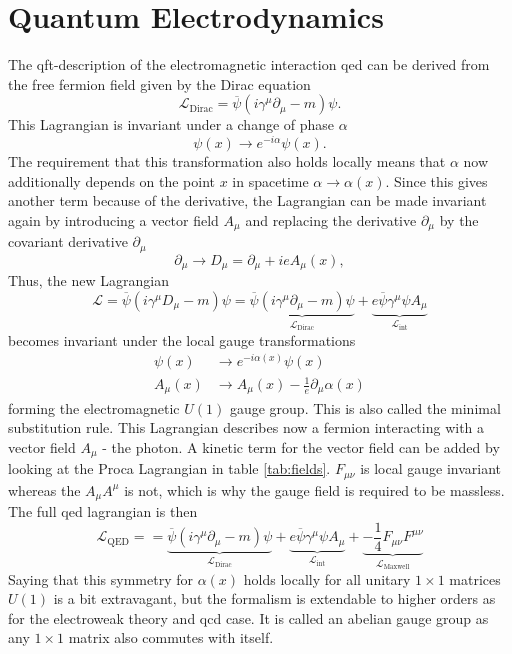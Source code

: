 \section{Quantum Electrodynamics}
 The \ac{qft}-description of the electromagnetic interaction \ac{qed} can be derived from the free fermion field given by the Dirac equation
\begin{equation}
    \mathcal{L}_\mathrm{Dirac} = \overline{\psi}(i \gamma^\mu \partial_\mu - m )\psi.
    \label{eq:dirac}
\end{equation}
This Lagrangian is invariant under a change of phase $\alpha$ 
\begin{equation}
    \psi(x) \rightarrow  e^{-i \alpha}\psi(x).
\end{equation}
The requirement that this transformation also holds locally means that $\alpha$ now additionally depends on the point $x$ in spacetime $\alpha \rightarrow \alpha(x)$. Since this gives another term because of the derivative, the Lagrangian can be made invariant again by introducing a vector field $A_\mu$ and replacing the derivative $\partial_\mu$ by the covariant derivative $\partial_\mu$ 
\begin{equation}
    \partial_\mu \rightarrow D_\mu = \partial_\mu + ie A_\mu(x),
    \label{eq:cov_diff}
\end{equation}
Thus, the new Lagrangian 
\begin{equation}
    \mathcal{L} = \overline{\psi}(i \gamma^\mu D_\mu - m )\psi
    =
    \underbrace{\overline{\psi}(i \gamma^\mu \partial_\mu - m )\psi}_{\mathcal{L}_\mathrm{Dirac} } 
    +
    \underbrace{ e\overline{\psi} \gamma^\mu {\psi}A_\mu}_{\mathcal{L}_\mathrm{int}}
\end{equation}
becomes invariant under the local gauge transformations
\begin{align}
\psi(x) &\rightarrow  e^{-i \alpha(x)}\psi(x)\\
 A_\mu(x) &\xrightarrow{} A_\mu(x) -\frac{1}{e}\partial_\mu\alpha(x)
\end{align}
forming the electromagnetic $U(1)$ gauge group. This is also called the minimal substitution rule. This Lagrangian describes now a fermion interacting with a vector field $A_\mu$ - the photon. A kinetic term for the vector field can be added by looking at the Proca Lagrangian in table \ref{tab:fields}. $F_{\mu\nu}$ is local gauge invariant whereas the $A_\mu A^\mu$ is not, which is why the gauge field is required to be massless. The full \ac{qed} lagrangian is then
\begin{equation}
    \mathcal{L}_\mathrm{QED}=
    =
    \underbrace{\overline{\psi}(i \gamma^\mu \partial_\mu - m )\psi}_{\mathcal{L}_\mathrm{Dirac} } 
    +
    \underbrace{ e\overline{\psi} \gamma^\mu {\psi}A_\mu}_{\mathcal{L}_\mathrm{int}}
    +
    \underbrace{-\frac{1}{4}F_{\mu\nu}F^{\mu\nu}}_{\mathcal{L}_\mathrm{Maxwell} } 
\end{equation}  
Saying that this symmetry for $\alpha(x)$ holds locally for all unitary $1\times1$  matrices $U(1)$ is a bit extravagant, but the formalism is extendable to higher orders as for the electroweak theory and \ac{qcd} case. It is called an abelian gauge group as any $1\times1$ matrix also commutes with itself.  